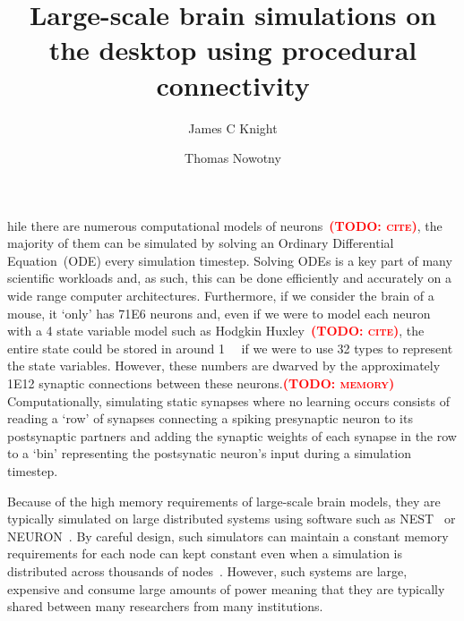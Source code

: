 \documentclass[9pt,twocolumn,twoside,lineno]{pnas-new}
\title{Large-scale brain simulations on the desktop using procedural connectivity}
\author[a,1]{James C Knight}
\author[a]{Thomas Nowotny}
\affil[a]{Centre for Computational Neuroscience and Robotics, School of Engineering and Informatics, University of Sussex, Brighton, United Kingdom}
\newcommand{\todo}[1]{\textbf{\textsc{\textcolor{red}{(TODO: #1)}}}}
\begin{document}
\maketitle
\thispagestyle{firststyle}

hile there are numerous computational models of neurons~\todo{cite}, the majority of them can be simulated by solving an Ordinary Differential Equation~(ODE) every simulation timestep.
Solving ODEs is a key part of many scientific workloads and, as such, this can be done efficiently and accurately on a wide range computer architectures.
Furthermore, if we consider the brain of a mouse, it `only' has \num{71E6} neurons and, even if we were to model each neuron with a 4 state variable model such as Hodgkin Huxley~\todo{cite}, the entire state could be stored in around \SI{1}{\giga\byte} if we were to use \SI{32}{\bit} types to represent the state variables.
However, these numbers are dwarved by the approximately \num{1E12} synaptic connections between these neurons.\todo{memory}
Computationally, simulating static synapses where no learning occurs consists of reading a `row' of synapses connecting a spiking presynaptic neuron to its postsynaptic partners and adding the synaptic weights of each synapse in the row to a `bin' representing the postsynatic neuron's input during a simulation timestep.

Because of the high memory requirements of large-scale brain models, they are typically simulated on large distributed systems using software such as NEST~\citep{Gewaltig2007} or NEURON~\citep{carnevale2006neuron}.
By careful design, such simulators can maintain a constant memory requirements for each node can kept constant even when a simulation is distributed across thousands of nodes~\citep{Jordan2018}.
However, such systems are large, expensive and consume large amounts of power meaning that they are typically shared between many researchers from many institutions.
\end{document}
